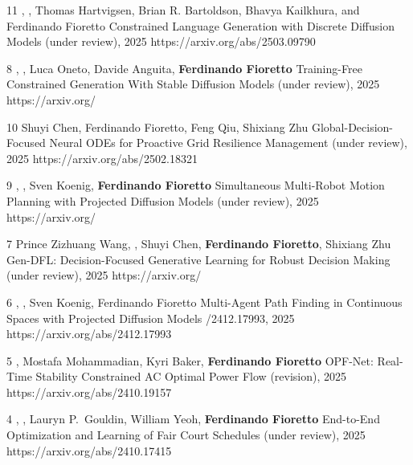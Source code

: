 \setcounter{nW}{12}
\begin{pubs}
\wsentry
	{11}
	{, , Thomas Hartvigsen, Brian R. Bartoldson, Bhavya Kailkhura, and Ferdinando Fioretto}
	{Constrained Language Generation with Discrete Diffusion Models}
	{ (under review), 2025}
	{https://arxiv.org/abs/2503.09790}

\wsentry
	{8}
	{, , Luca Oneto, Davide Anguita, {\bf Ferdinando Fioretto}}
	{Training-Free Constrained Generation With Stable Diffusion Models}
	{ (under review), 2025}
	{https://arxiv.org/}

\wsentry
	{10}
	{Shuyi Chen, Ferdinando Fioretto, Feng Qiu, Shixiang Zhu}
	{Global-Decision-Focused Neural ODEs for Proactive Grid Resilience Management}
	{  (under review), 2025}
	{https://arxiv.org/abs/2502.18321}
	
\wsentry
	{9}
	{, , Sven Koenig, {\bf Ferdinando Fioretto}}
	{Simultaneous Multi-Robot Motion Planning with Projected Diffusion Models}
	{ (under review), 2025}
	{https://arxiv.org/}

\wsentry
	{7}
	{Prince Zizhuang Wang, , Shuyi Chen, {\bf Ferdinando Fioretto}, Shixiang Zhu}
	{Gen-DFL: Decision-Focused Generative Learning for Robust Decision Making}
	{ (under review), 2025}
	{https://arxiv.org/}

\wsentry
	{6}
	{, , Sven Koenig, Ferdinando Fioretto} 
	{Multi-Agent Path Finding in Continuous Spaces with Projected Diffusion Models}
	{/2412.17993, 2025}
	{https://arxiv.org/abs/2412.17993}

\wsentry
	{5}
	{, Mostafa Mohammadian, Kyri Baker, {\bf Ferdinando Fioretto}}
	{OPF-Net: Real-Time Stability Constrained AC Optimal Power Flow}
	{ (revision), 2025}
	{https://arxiv.org/abs/2410.19157}

\wsentry
	{4}
	{, , Lauryn P.~Gouldin, William Yeoh, {\bf Ferdinando Fioretto}}
	{End-to-End Optimization and Learning of Fair Court Schedules}
	{ (under review), 2025}
	{https://arxiv.org/abs/2410.17415}


\end{pubs}
